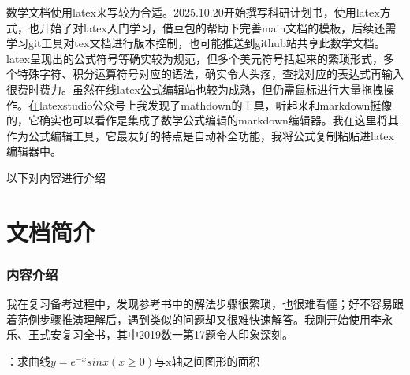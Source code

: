 \documentclass[12pt]{report}
\begin{document}
   数学文档使用latex来写较为合适。2025.10.20开始撰写科研计划书，使用latex方式，也开始了对latex入门学习，借豆包的帮助下完善main文档的模板，后续还需学习git工具对tex文档进行版本控制，也可能推送到github站共享此数学文档。latex呈现出的公式符号等确实较为规范，但多个美元符号括起来的繁琐形式，多个特殊字符、积分运算符号对应的语法，确实令人头疼，查找对应的表达式再输入很费时费力。虽然在线latex公式编辑站也较为成熟，但仍需鼠标进行大量拖拽操作。在latexstudio公众号上我发现了mathdown的工具，听起来和markdown挺像的，它确实也可以看作是集成了数学公式编辑的markdown编辑器。我在这里将其作为公式编辑工具，它最友好的特点是自动补全功能，我将公式复制粘贴进latex编辑器中。
   
   以下对内容进行介绍
   
   \clearpage
   
   \chapter*{文档简介}
   \thispagestyle{empty} %
   \subsection*{\centering 内容介绍}
   我在复习备考过程中，发现参考书中的解法步骤很繁琐，也很难看懂；好不容易跟着范例步骤推演理解后，遇到类似的问题却又很难快速解答。我刚开始使用李永乐、王式安复习全书，其中2019数一第17题令人印象深刻。
   
   ：求曲线$y=e^{-x}sinx\left(x\geqslant0\right)$与x轴之间图形的面积
   
   \vspace{10pt}
   
\end{document}
